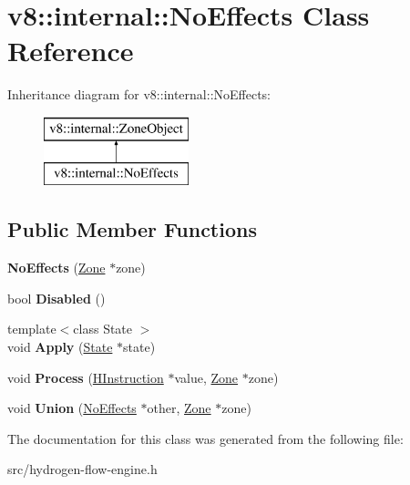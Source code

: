 \hypertarget{classv8_1_1internal_1_1_no_effects}{}\section{v8\+:\+:internal\+:\+:No\+Effects Class Reference}
\label{classv8_1_1internal_1_1_no_effects}
Inheritance diagram for v8\+:\+:internal\+:\+:No\+Effects\+:\begin{figure}[H]
\begin{center}
\leavevmode
\includegraphics[height=2.000000cm]{classv8_1_1internal_1_1_no_effects}
\end{center}
\end{figure}
\subsection*{Public Member Functions}
\begin{DoxyCompactItemize}
\item 
\hypertarget{classv8_1_1internal_1_1_no_effects_a1a45887837888698342d11a81f7baa33}{}{\bfseries No\+Effects} (\hyperlink{classv8_1_1internal_1_1_zone}{Zone} $\ast$zone)\label{classv8_1_1internal_1_1_no_effects_a1a45887837888698342d11a81f7baa33}

\item 
\hypertarget{classv8_1_1internal_1_1_no_effects_a6a2ff3ceffca0c1c7e9b0820322d90af}{}bool {\bfseries Disabled} ()\label{classv8_1_1internal_1_1_no_effects_a6a2ff3ceffca0c1c7e9b0820322d90af}

\item 
\hypertarget{classv8_1_1internal_1_1_no_effects_ac783f5f448565d6a6a743d4e626ba486}{}{\footnotesize template$<$class State $>$ }\\void {\bfseries Apply} (\hyperlink{classv8_1_1internal_1_1_state}{State} $\ast$state)\label{classv8_1_1internal_1_1_no_effects_ac783f5f448565d6a6a743d4e626ba486}

\item 
\hypertarget{classv8_1_1internal_1_1_no_effects_a81790adf1004bd1def765c5ae246a06c}{}void {\bfseries Process} (\hyperlink{classv8_1_1internal_1_1_h_instruction}{H\+Instruction} $\ast$value, \hyperlink{classv8_1_1internal_1_1_zone}{Zone} $\ast$zone)\label{classv8_1_1internal_1_1_no_effects_a81790adf1004bd1def765c5ae246a06c}

\item 
\hypertarget{classv8_1_1internal_1_1_no_effects_aa1ab37c6e6905a6389a82ea6630eee84}{}void {\bfseries Union} (\hyperlink{classv8_1_1internal_1_1_no_effects}{No\+Effects} $\ast$other, \hyperlink{classv8_1_1internal_1_1_zone}{Zone} $\ast$zone)\label{classv8_1_1internal_1_1_no_effects_aa1ab37c6e6905a6389a82ea6630eee84}

\end{DoxyCompactItemize}


The documentation for this class was generated from the following file\+:\begin{DoxyCompactItemize}
\item 
src/hydrogen-\/flow-\/engine.\+h\end{DoxyCompactItemize}

